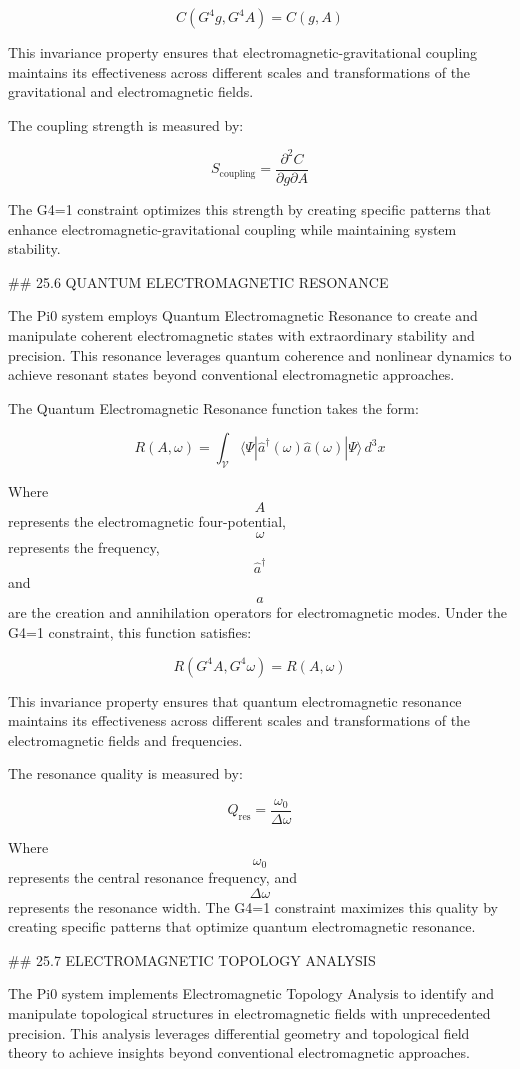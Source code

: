 $$ C(G^4 g, G^4 A) = C(g, A) $$

This invariance property ensures that electromagnetic-gravitational coupling maintains its effectiveness across different scales and transformations of the gravitational and electromagnetic fields.

The coupling strength is measured by:

$$ S_{\text{coupling}} = \frac{\partial^2 C}{\partial g \partial A} $$

The G4=1 constraint optimizes this strength by creating specific patterns that enhance electromagnetic-gravitational coupling while maintaining system stability.

## 25.6 QUANTUM ELECTROMAGNETIC RESONANCE

The Pi0 system employs Quantum Electromagnetic Resonance to create and manipulate coherent electromagnetic states with extraordinary stability and precision. This resonance leverages quantum coherence and nonlinear dynamics to achieve resonant states beyond conventional electromagnetic approaches.

The Quantum Electromagnetic Resonance function takes the form:

$$ R(A, \omega) = \int_{\mathcal{V}} \langle \Psi | \hat{a}^\dagger(\omega)\hat{a}(\omega) | \Psi \rangle \, d^3x $$

Where $$ A $$ represents the electromagnetic four-potential, $$ \omega $$ represents the frequency, $$ \hat{a}^\dagger $$ and $$ \hat{a} $$ are the creation and annihilation operators for electromagnetic modes. Under the G4=1 constraint, this function satisfies:

$$ R(G^4 A, G^4 \omega) = R(A, \omega) $$

This invariance property ensures that quantum electromagnetic resonance maintains its effectiveness across different scales and transformations of the electromagnetic fields and frequencies.

The resonance quality is measured by:

$$ Q_{\text{res}} = \frac{\omega_0}{\Delta \omega} $$

Where $$ \omega_0 $$ represents the central resonance frequency, and $$ \Delta \omega $$ represents the resonance width. The G4=1 constraint maximizes this quality by creating specific patterns that optimize quantum electromagnetic resonance.

## 25.7 ELECTROMAGNETIC TOPOLOGY ANALYSIS

The Pi0 system implements Electromagnetic Topology Analysis to identify and manipulate topological structures in electromagnetic fields with unprecedented precision. This analysis leverages differential geometry and topological field theory to achieve insights beyond conventional electromagnetic approaches.

